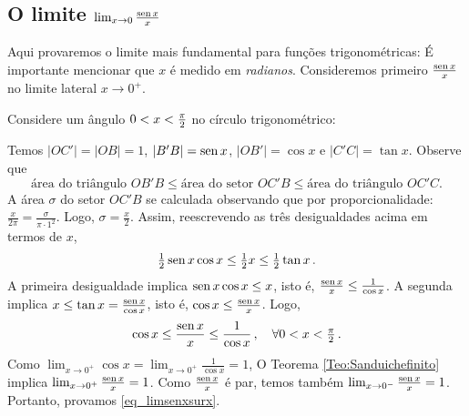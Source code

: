 \subsection{O limite $\lim_{x\to 0}\tfrac{\operatorname{sen} x}{x}$}
Aqui provaremos o limite mais fundamental para funções trigonométricas:
É importante mencionar que $x$ é medido em \emph{radianos}.
Consideremos primeiro $\tfrac{\operatorname{sen} x}{x}$ no limite lateral $x\to 0^+$.

Considere um ângulo $0<x<\tfrac{\pi}{2}$ no círculo trigonométrico:
\begin{center}
\begin{bmlimage}\end{bmlimage}
\end{center}

Temos $|OC'|=|OB|=1$, $|B'B|=\operatorname{sen} x$, $|OB'|=\cos x$ e $|C'C|=\tan x$.
Observe que 
\[ 
\text{área do triângulo }OB'B\leq
\text{área do setor }OC'B\leq
\text{área do triângulo }OC'C.
\]
A área $\sigma$ do setor $OC'B$ se
calculada observando que por proporcionalidade:
$\frac{x}{2\pi}=\frac{\sigma}{\pi\cdot 1^2}$. Logo,
$\sigma=\frac{x}{2}$. Assim, reescrevendo as três desigualdades acima em termos
de $x$,
$$\tfrac12 \operatorname{sen} x\cos x\leq \tfrac12 x\leq \tfrac12 \tan x\,.$$
A primeira desigualdade implica $\operatorname{sen} x\cos x\leq x$, isto é,
$\frac{\operatorname{sen} x}{x}\leq \frac{1}{\cos x}$. A segunda implica 
$x\leq \tan x=\frac{\operatorname{sen} x}{\cos x}$,
isto é, $\cos x\leq \frac{\operatorname{sen} x}{x}$. Logo,
$$\cos x\leq \frac{\operatorname{sen} x}{x}\leq \frac{1}{\cos x}\,,\quad\forall 0<x<\tfrac{\pi}{2}\,.
$$
Como $\lim_{x\to 0^+}\cos x=\lim_{x\to 0^+}\frac{1}{\cos x}=1$, O Teorema \ref{Teo:Sanduichefinito} implica
$\lim_{x\to 0^+}\frac{\operatorname{sen} x}{x}=1$.
Como $\frac{\operatorname{sen} x}{x}$ é par, temos também $\lim_{x\to
0^-}\frac{\operatorname{sen} x}{x}=1$. Portanto, provamos \eqref{eq_limsenxsurx}.

